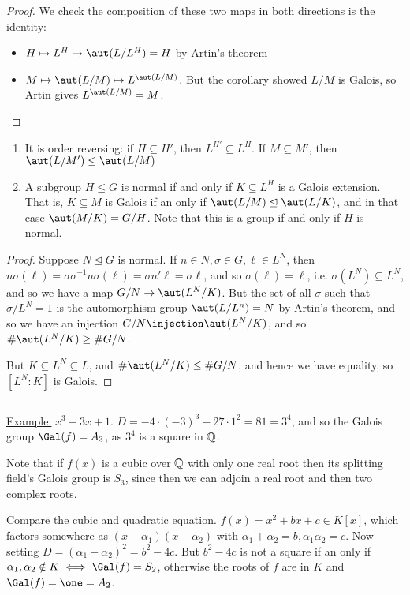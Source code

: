 \documentclass[a4paper, 10pt, twocolumn]{amsart}
\begin{document}
\begin{proof}
We check the composition of these two maps in both directions is the identity:
\begin{itemize}
\item $H \mapsto L^H \mapsto \aut(L/L^H) = H$ by Artin's theorem
\item $M \mapsto \aut(L/M) \mapsto L^{\aut(L/M)}$. But the corollary showed $L/M$ is Galois, so Artin gives $L^{\aut(L/M)} = M$.
\end{itemize}
\end{proof}
\begin{theorem}\item
\begin{enumerate}
\item It is order reversing: if $H \subseteq H'$, then $L^{H'} \subseteq L^H$. If $M\subseteq M'$, then $\aut(L/M') \leq \aut(L/M)$

\item A subgroup $H \leq G$ is normal if and only if $K \subseteq L^H$ is a Galois extension. That is, $K \subseteq M$ is Galois if an only if $\aut(L/M) \trianglelefteq \aut(L/K)$, and in that case $\aut(M/K) = G/H$. Note that this is a group if and only if $H$ is normal.
\end{enumerate}
\end{theorem}
\begin{proof}
Suppose $N \trianglelefteq G$ is normal. If $n \in N, \sigma \in G, \ell \in L^N$, then $n\sigma(\ell) = \sigma \sigma^{-1} n \sigma(\ell) = \sigma n' \ell = \sigma \ell$, and so $\sigma(\ell) = \ell$, i.e. $\sigma(L^N) \subseteq L^N$, and so we have a map $G/N \to \aut(L^N/K)$. But the set of all $\sigma$ such that $\sigma/L^N = 1$ is the automorphism group $\aut(L/L^n) = N$ by Artin's theorem, and so we have an injection $G/N \injection \aut(L^N/K)$, and so $\#\aut(L^N/K) \geq \#G/N$.

But $K \subseteq L^N \subseteq L$, and $\#\aut(L^N/K) \leq \#G/N$, and hence we have equality, so $[L^N:K]$ is Galois.
\end{proof}
\hrule
\underline{Example:} $x^3 - 3x + 1$. $D = -4\cdot (-3)^3 - 27\cdot 1^2 = 81 = 3^4$, and so the Galois group $\Gal(f) = A_3$, as $3^4$ is a square in $\mathbb{Q}$.

Note that if $f(x)$ is a cubic over $\mathbb{Q}$ with only one real root then its splitting field's Galois group is $S_3$, since then we can adjoin a real root and then two complex roots.

Compare the cubic and quadratic equation. $f(x) = x^2 + bx + c \in K[x]$, which factors somewhere as $(x-\alpha_1)(x-\alpha_2)$ with $\alpha_1+\alpha_2 = b, \alpha_1\alpha_2 = c$. Now setting $D = (\alpha_1-\alpha_2)^2 = b^2-4c$. But $b^2-4c$ is not a square if an only if $\alpha_1, \alpha_2 \notin K \iff \Gal(f) = S_2$, otherwise the roots of $f$ are in $K$ and $\Gal(f) = \one = A_2$.
\end{document}

